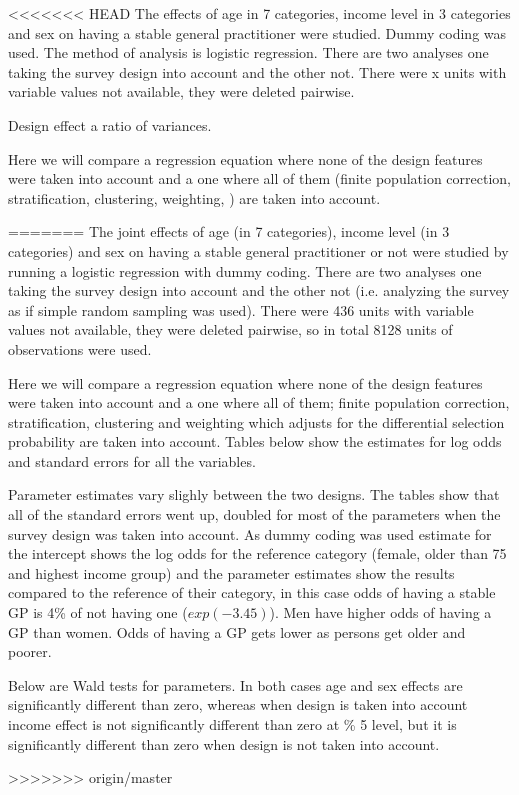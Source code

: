 <<<<<<< HEAD
The effects of age in 7 categories, income level in 3 categories and sex on having a stable general practitioner were studied. Dummy coding was used. The method of analysis is logistic regression. There are two analyses one taking the survey design into account and the other not. There were x units with variable values not available, they were deleted pairwise. 

Design effect a ratio of variances.

Here we will compare a regression equation where none of the design features were taken into account and a one where all of them (finite population correction, stratification, clustering, weighting, ) are taken into account.




=======
The joint effects of age (in 7 categories), income level (in 3 categories) and sex on having a stable general practitioner or not were studied by running a logistic regression with dummy coding. There are two analyses one taking the survey design into account and the other not (i.e. analyzing the survey as if simple random sampling was used). There were 436 units with variable values not available, they were deleted pairwise, so in total 8128 units of observations were used.

Here we will compare a regression equation where none of the design features were taken into account and a one where all of them; finite population correction, stratification, clustering and weighting which adjusts for the differential selection probability are taken into account. Tables below show the estimates for log odds and standard errors for all the variables.





Parameter estimates vary slighly between the two designs. The tables show that all of the standard errors went up, doubled for most of the parameters when the survey design was taken into account. As dummy coding was used estimate for the intercept shows the log odds for the reference category (female, older than 75 and highest income group) and the parameter estimates show the results compared to the reference of their category, in this case odds of having a stable GP is 4\% of not having one ($exp(-3.45)$). Men have higher odds of having a GP than women. Odds of having a GP gets lower as persons get older and poorer.

Below are Wald tests for parameters. In both cases age and sex effects are significantly different than zero, whereas when design is taken into account income effect is not significantly different than zero at \% 5 level, but it is significantly different than zero when design is not taken into account. 




>>>>>>> origin/master
